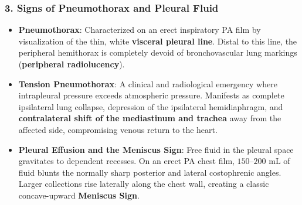 \documentclass[11pt,a4paper]{article}
\begin{document}
\subsubsection{3. Signs of Pneumothorax and Pleural Fluid}
\begin{itemize}[leftmargin=*]
    \item \textbf{Pneumothorax}: Characterized on an erect inspiratory PA film by visualization of the thin, white \textbf{visceral pleural line}. Distal to this line, the peripheral hemithorax is completely devoid of bronchovascular lung markings (\textbf{peripheral radiolucency}).
    \item \textbf{Tension Pneumothorax}: A clinical and radiological emergency where intrapleural pressure exceeds atmospheric pressure. Manifests as complete ipsilateral lung collapse, depression of the ipsilateral hemidiaphragm, and \textbf{contralateral shift of the mediastinum and trachea} away from the affected side, compromising venous return to the heart.
    \item \textbf{Pleural Effusion and the Meniscus Sign}: Free fluid in the pleural space gravitates to dependent recesses. On an erect PA chest film, $150\text{--}200\text{ mL}$ of fluid blunts the normally sharp posterior and lateral costophrenic angles. Larger collections rise laterally along the chest wall, creating a classic concave-upward \textbf{Meniscus Sign}.
\end{itemize}
\end{document}

